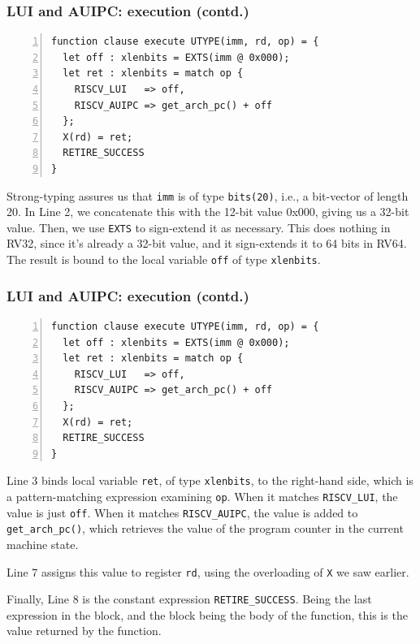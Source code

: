 \documentclass[aspectratio=169]{beamer}
\newcommand{\slidefont}{\scriptsize}
\newcommand{\cf}{\scriptsize\tt}
\begin{document}

\begin{frame}[fragile]
  \frametitle{LUI and AUIPC: execution (contd.)}

  \slidefont

  \begin{Verbatim}[frame=single, numbers=left, label = File riscv\_insts\_base.sail]
function clause execute UTYPE(imm, rd, op) = {
  let off : xlenbits = EXTS(imm @ 0x000);
  let ret : xlenbits = match op {
    RISCV_LUI   => off,
    RISCV_AUIPC => get_arch_pc() + off
  };
  X(rd) = ret;
  RETIRE_SUCCESS
}
  \end{Verbatim}

  \begin{minipage}{\textwidth}
    Strong-typing assures us that {\cf imm} is of type {\cf bits(20)},
    i.e., a bit-vector of length 20.  In Line 2, we concatenate this
    with the 12-bit value 0x000, giving us a 32-bit value.  Then, we
    use {\cf EXTS} to sign-extend it as necessary. This does nothing
    in RV32, since it's already a 32-bit value, and it sign-extends it
    to 64 bits in RV64.  The result is bound to the local variable
    {\cf off} of type {\cf xlenbits}.
  \end{minipage}

\end{frame}


\begin{frame}[fragile]
  \frametitle{LUI and AUIPC: execution (contd.)}

  \slidefont

  \begin{Verbatim}[frame=single, numbers=left, label = File riscv\_insts\_base.sail]
function clause execute UTYPE(imm, rd, op) = {
  let off : xlenbits = EXTS(imm @ 0x000);
  let ret : xlenbits = match op {
    RISCV_LUI   => off,
    RISCV_AUIPC => get_arch_pc() + off
  };
  X(rd) = ret;
  RETIRE_SUCCESS
}
  \end{Verbatim}

  \begin{minipage}{\textwidth}
    Line 3 binds local variable {\cf ret}, of type {\cf xlenbits}, to
    the right-hand side, which is a pattern-matching expression
    examining {\cf op}.  When it matches {\cf RISCV\_LUI}, the value
    is just {\cf off}.  When it matches {\cf RISCV\_AUIPC}, the value
    is added to {\cf get\_arch\_pc()}, which retrieves the value of
    the program counter in the current machine state.

    \vspace{1ex}

    Line 7 assigns this value to register {\cf rd}, using the overloading of {\cf X} we saw earlier.

    \vspace{1ex}

    Finally, Line 8 is the constant expression {\cf RETIRE\_SUCCESS}.
    Being the last expression in the block, and the block being the
    body of the function, this is the value returned by the function.
  \end{minipage}

\end{frame}
\end{document}
